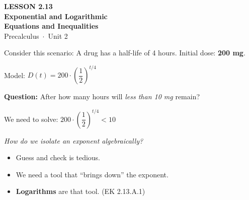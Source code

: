 \documentclass[aspectratio=169, 11pt]{beamer}
\begin{document}
{
\begin{frame}[plain]
  \vspace{2.8cm}\hspace{0.55cm}%
  \begin{minipage}{0.9\textwidth}
    {\color{goldacc}\bfseries\small LESSON 2.13}\\[0.5cm]
    {\color{white}\bfseries\LARGE Exponential and Logarithmic\\[4pt]
    Equations and Inequalities}\\[1.2cm]
    {\color{skymid}\small Precalculus~$\cdot$~Unit 2}
  \end{minipage}
\end{frame}
}

\begin{frame}[t, plain]

  \vspace{0.3cm}
  \begin{block}{Consider this scenario:}
    A drug has a half-life of 4 hours. Initial dose: \textbf{200 mg}.

    \vspace{0.2cm}
    Model: \quad $D(t) = 200\cdot\!\left(\dfrac{1}{2}\right)^{t/4}$
  \end{block}

  \vspace{0.3cm}
  \textbf{Question:} After how many hours will \emph{less than 10 mg} remain?

  \vspace{0.2cm}
  We need to solve: \quad $\displaystyle 200\cdot\!\left(\dfrac{1}{2}\right)^{t/4} < 10$

  \vspace{0.3cm}
  \textit{How do we isolate an exponent algebraically?}
  \setlength{\itemsep}{6pt}
  \begin{itemize}
    \item Guess and check is tedious.
    \item We need a tool that ``brings down'' the exponent.
    \item \textbf{Logarithms} are that tool. (EK 2.13.A.1)
  \end{itemize}
\end{frame}
\end{document}
